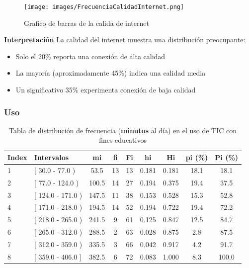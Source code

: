 \documentclass[12pt, a4paper]{article}
\begin{document}
\begin{figure}[H]
    \begin{center}
        \texttt{[image: images/FrecuenciaCalidadInternet.png]}
    \end{center}
    \label{fig:FrecuenciaCalidadInternet}
    \caption{Grafico de barras de la calida de internet}
\end{figure}

\textbf{Interpretación}
La calidad del internet muestra una distribución preocupante:
\begin{itemize}
    \item Solo el 20\% reporta una conexión de alta calidad
    \item La mayoría (aproximadamente 45\%) indica una calidad media
    \item Un significativo 35\% experimenta conexión de baja calidad
\end{itemize}

\subsubsection{Uso}

\begin{table}[H]
    \centering

    \begin{tabular}{llccccccc}
        \toprule
        \textbf{Index} & \textbf{Intervalos} & \textbf{mi} & \textbf{fi} & \textbf{Fi} & \textbf{hi} & \textbf{Hi} & \textbf{pi (\%)} & \textbf{Pi (\%)} \\
        \midrule
        1 & [ 30.0 - 77.0 )  & 53.5  & 13 & 13 & 0.181 & 0.181 & 18.1 & 18.1 \\
        2 & [ 77.0 - 124.0 ) & 100.5 & 14 & 27 & 0.194 & 0.375 & 19.4 & 37.5 \\
        3 & [ 124.0 - 171.0 ) & 147.5 & 11 & 38 & 0.153 & 0.528 & 15.3 & 52.8 \\
        4 & [ 171.0 - 218.0 ) & 194.5 & 14 & 52 & 0.194 & 0.722 & 19.4 & 72.2 \\
        5 & [ 218.0 - 265.0 ) & 241.5 & 9  & 61 & 0.125 & 0.847 & 12.5 & 84.7 \\
        6 & [ 265.0 - 312.0 ) & 288.5 & 2  & 63 & 0.028 & 0.875 & 2.8  & 87.5 \\
        7 & [ 312.0 - 359.0 ) & 335.5 & 3  & 66 & 0.042 & 0.917 & 4.2  & 91.7 \\
        8 & [ 359.0 - 406.0 ] & 382.5 & 6  & 72 & 0.083 & 1.000	 & 8.3  & 100.0 \\
        \bottomrule
    \end{tabular}
    \vspace{0.1cm}
    \caption{Tabla de distribución de frecuencia (\textbf{minutos} al día) en el uso de TIC con fines educativos}
    \label{tab:frecuenciaUso}
\end{table}
\end{document}
